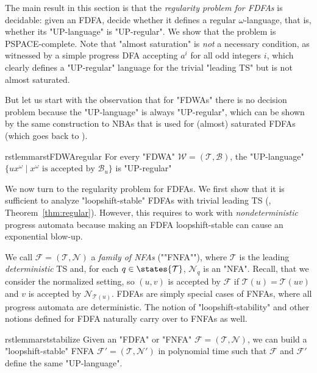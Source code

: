 \documentclass[a4paper,USenglish,cleveref,autoref,thm-restate]{lipics-v2021}
\newcommand{\mc}[1]{\ensuremath{\mathcal{#1}}}
\newcommand{\T}{\mc{T}}
\newcommand{\F}{\mc{F}}
\newcommand{\N}{\mc{N}}
\newcommand{\B}{\mc{B}}
\newcommand{\W}{\mc{W}}
\newcommand{\PSPACE}{\textsf{PSPACE}\xspace}
\begin{document}
The main result in this section is that the \emph{regularity problem for FDFAs} is decidable: given an FDFA, decide whether it defines a regular $\omega$-language, that is, whether its "UP-language" is "UP-regular". We show that the problem is \PSPACE-complete. Note that "almost saturation" is \emph{not} a necessary condition, as witnessed by a simple progress DFA accepting $a^i$ for all odd integers $i$, which clearly defines a "UP-regular" language for the trivial "leading TS" but is not almost saturated.

But let us start with the observation that for "FDWAs" there is no decision problem because the "UP-language" is always "UP-regular", which can be shown by the same construction to NBAs that is used for (almost) saturated FDFAs (which goes back to \cite{CalbrixNP93}).

\begin{restatable}{rstlemma}{rstFDWAregular} \label{lemma:FDWAregular}
  For every "FDWA" $\W = (\T,\B)$, the "UP-language" $\{ux^\omega \mid x^\omega \text{ is accepted by } \B_u\}$ is "UP-regular"
\end{restatable}







We now turn to the regularity problem for FDFAs.  We first show that it is sufficient to analyze "loopshift-stable" FDFAs with trivial leading TS (, Theorem~\ref{thm:regular}). However, this requires to work with \emph{nondeterministic} progress automata because making an FDFA loopshift-stable can cause an exponential blow-up.


\AP
We call $\F=(\T,\N)$ a \emph{family of NFAs} (""FNFA""), where $\T$ is the leading \emph{deterministic} TS and, for each $q \in \states{\T}$, $\N_q$ is an "NFA".
Recall, that we consider the normalized setting, so $(u,v)$ is accepted by $\F$ if $\T(u) = \T(uv)$ and $v$ is accepted by $\N_{\T(u)}$.
FDFAs are simply special cases of FNFAs, where all progress automata are deterministic.
The notion of "loopshift-stability" and other notions defined for FDFA naturally carry over to FNFAs as well.


\begin{restatable}{rstlemma}{rststabilize}
  \label{lem:stabalize}
  Given an "FDFA" or "FNFA" $\F = (\T,\N)$, we can build a "loopshift-stable"
  FNFA $\F'=(\T,\N')$ in polynomial time such that $\F$ and $\F'$ define the same "UP-language".
\end{restatable}
\end{document}
